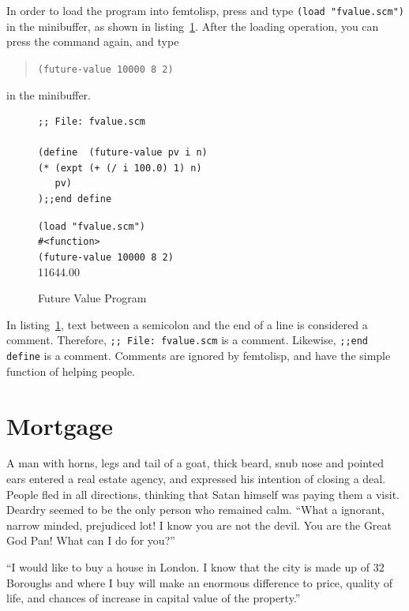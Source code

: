 \documentclass[a4paper,12pt]{book}
\newenvironment{fmpage}[1]
           {\begin{lrbox}{\fmbox}\begin{minipage}{#1}}
           {\end{minipage}\end{lrbox}\fbox{\usebox{\fmbox}}}
\begin{document}
In order to load the program into
femtolisp, press 
and type \verb|(load "fvalue.scm")|
in the minibuffer, as shown in
listing~\ref{Texan:parking}.
After the loading operation,
you can press the
 command again,
and type
\begin{quote}
\verb|(future-value 10000 8 2)|
\end{quote}
in the minibuffer.

\begin{figure}[!h]
\begin{fmpage}{0.8\textwidth}
\begin{verbatim}
;; File: fvalue.scm

(define  (future-value pv i n)
(* (expt (+ (/ i 100.0) 1) n) 
   pv)
);;end define
\end{verbatim}
\end{fmpage}

\begin{fmpage}{0.8\textwidth}
\verb|(load "fvalue.scm")|\\
\verb|#<function>|\\
\verb|(future-value 10000 8 2)|\\
11644.00
\end{fmpage}
\caption{Future Value Program}
\label{Texan:parking}
\end{figure}

In listing~\ref{Texan:parking}, text
between a semicolon and the end of
a line is considered a comment.
Therefore, \verb|;; File: fvalue.scm|
is a comment. Likewise, \verb|;;end define|
is a comment. Comments are ignored by
femtolisp, and have the simple function of
helping people.

\section{Mortgage}
A man with horns, legs and tail of a goat,
thick beard, snub nose and pointed ears entered
a real estate agency, and expressed his intention
of closing a deal. People fled in all directions,
thinking that Satan himself was paying them a visit.
Deardry seemed to be the only person who remained
calm. “What a ignorant, narrow minded, prejudiced
lot! I know you are not the devil. You are the
Great God Pan! What can I do for you?”

“I would like to buy a house in London.
I know that the city is made up of 32 Boroughs
and where I buy will make an enormous difference
to price, quality of life, and chances of increase
in capital value of the property.”
\end{document}
